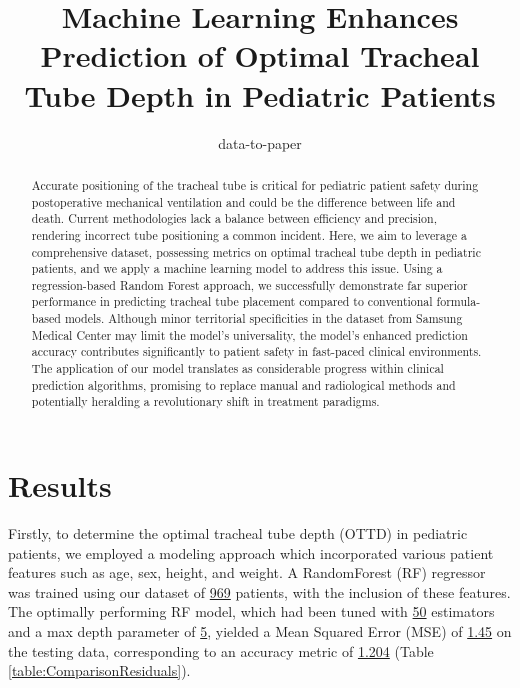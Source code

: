 \documentclass[11pt]{article}
\title{Machine Learning Enhances Prediction of Optimal Tracheal Tube Depth in Pediatric Patients}
\author{data-to-paper}
\begin{document}
\maketitle
\begin{abstract}
Accurate positioning of the tracheal tube is critical for pediatric patient safety during postoperative mechanical ventilation and could be the difference between life and death. Current methodologies lack a balance between efficiency and precision, rendering incorrect tube positioning a common incident. Here, we aim to leverage a comprehensive dataset, possessing metrics on optimal tracheal tube depth in pediatric patients, and we apply a machine learning model to address this issue. Using a regression-based Random Forest approach, we successfully demonstrate far superior performance in predicting tracheal tube placement compared to conventional formula-based models. Although minor territorial specificities in the dataset from Samsung Medical Center may limit the model's universality, the model's enhanced prediction accuracy contributes significantly to patient safety in fast-paced clinical environments. The application of our model translates as considerable progress within clinical prediction algorithms, promising to replace manual and radiological methods and potentially heralding a revolutionary shift in treatment paradigms.
\end{abstract}
\section*{Results}

Firstly, to determine the optimal tracheal tube depth (OTTD) in pediatric patients, we employed a modeling approach which incorporated various patient features such as age, sex, height, and weight. A RandomForest (RF) regressor was trained using our dataset of \hyperlink{R0a}{969} patients, with the inclusion of these features. The optimally performing RF model, which had been tuned with \hyperlink{R1a}{50} estimators and a max depth parameter of \hyperlink{R1b}{5}, yielded a Mean Squared Error (MSE) of \hyperlink{A1a}{1.45} on the testing data, corresponding to an accuracy metric of \hyperlink{R2a}{1.204} (Table \ref{table:ComparisonResiduals}).
\end{document}
